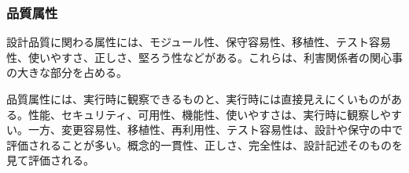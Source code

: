 \subsubsection{品質属性}

設計品質に関わる属性には、モジュール性、保守容易性、移植性、テスト容易性、使いやすさ、正しさ、堅ろう性などがある。これらは、利害関係者の関心事の大きな部分を占める。

品質属性には、実行時に観察できるものと、実行時には直接見えにくいものがある。性能、セキュリティ、可用性、機能性、使いやすさは、実行時に観察しやすい。一方、変更容易性、移植性、再利用性、テスト容易性は、設計や保守の中で評価されることが多い。概念的一貫性、正しさ、完全性は、設計記述そのものを見て評価される。
